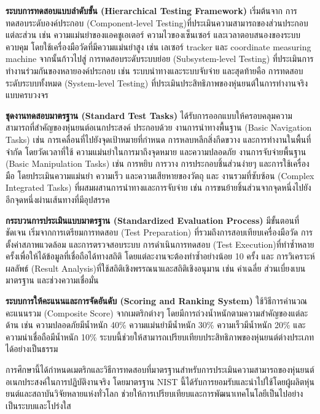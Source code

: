 \documentclass[a4paper]{article}
\begin{document}
\textbf{ระบบการทดสอบแบบลำดับขั้น (Hierarchical Testing Framework)} เริ่มต้นจาก การทดสอบระดับองค์ประกอบ (Component-level Testing)ที่ประเมินความสามารถของส่วนประกอบแต่ละส่วน เช่น ความแม่นยำของแอคชูเอเตอร์ ความไวของเซ็นเซอร์ และเวลาตอบสนองของระบบควบคุม โดยใช้เครื่องมือวัดที่มีความแม่นยำสูง เช่น เลเซอร์ tracker และ coordinate measuring machine จากนั้นก้าวไปสู่ การทดสอบระดับระบบย่อย (Subsystem-level Testing) ที่ประเมินการทำงานร่วมกันของหลายองค์ประกอบ เช่น ระบบนำทางและระบบจับจ่าย และสุดท้ายคือ การทดสอบระดับระบบทั้งหมด (System-level Testing) ที่ประเมินประสิทธิภาพของหุ่นยนต์ในการทำงานจริงแบบครบวงจร

\textbf{ชุดงานทดสอบมาตรฐาน (Standard Test Tasks)} ได้รับการออกแบบให้ครอบคลุมความสามารถที่สำคัญของหุ่นยนต์อเนกประสงค์ \parencite{xie2024pose} ประกอบด้วย งานการนำทางพื้นฐาน (Basic Navigation Tasks) เช่น การเคลื่อนที่ไปยังจุดเป้าหมายที่กำหนด การหลบหลีกสิ่งกีดขวาง และการทำงานในพื้นที่จำกัด โดยวัดเวลาที่ใช้ ความแม่นยำในการมาถึงจุดหมาย และความปลอดภัย งานการจับจ่ายพื้นฐาน (Basic Manipulation Tasks) เช่น การหยิบ การวาง การประกอบชิ้นส่วนง่ายๆ และการใช้เครื่องมือ โดยประเมินความแม่นยำ ความเร็ว และความเสียหายของวัตถุ และ งานรวมที่ซับซ้อน (Complex Integrated Tasks) ที่ผสมผสานการนำทางและการจับจ่าย เช่น การขนย้ายชิ้นส่วนจากจุดหนึ่งไปยังอีกจุดหนึ่งผ่านเส้นทางที่มีอุปสรรค

\textbf{กระบวนการประเมินแบบมาตรฐาน (Standardized Evaluation Process)} มีขั้นตอนที่ชัดเจน เริ่มจากการเตรียมการทดสอบ (Test Preparation) ที่รวมถึงการสอบเทียบเครื่องมือวัด การตั้งค่าสภาพแวดล้อม และการตรวจสอบระบบ การดำเนินการทดสอบ (Test Execution)ที่ทำซ้ำหลาย ครั้งเพื่อให้ได้ข้อมูลที่เชื่อถือได้ทางสถิติ โดยแต่ละงานจะต้องทำซ้ำอย่างน้อย 10 ครั้ง และ การวิเคราะห์ผลลัพธ์ (Result Analysis)ที่ใช้สถิติเชิงพรรณนาและสถิติเชิงอนุมาน เช่น ค่าเฉลี่ย ส่วนเบี่ยงเบนมาตรฐาน และช่วงความเชื่อมั่น

\textbf{ระบบการให้คะแนนและการจัดอันดับ (Scoring and Ranking System)} ใช้วิธีการคำนวณคะแนนรวม (Composite Score) จากเมตริกต่างๆ โดยมีการถ่วงน้ำหนักตามความสำคัญของแต่ละด้าน เช่น ความปลอดภัยมีน้ำหนัก 40\% ความแม่นยำมีน้ำหนัก 30\% ความเร็วมีน้ำหนัก 20\% และความน่าเชื่อถือมีน้ำหนัก 10\% ระบบนี้ช่วยให้สามารถเปรียบเทียบประสิทธิภาพของหุ่นยนต์ต่างประเภทได้อย่างเป็นธรรม

การศึกษานี้ได้กำหนดเมตริกและวิธีการทดสอบที่มาตรฐานสำหรับการประเมินความสามารถของหุ่นยนต์อเนกประสงค์ในการปฏิบัติงานจริง โดยมาตรฐาน NIST นี้ได้รับการยอมรับและนำไปใช้โดยผู้ผลิตหุ่นยนต์และสถาบันวิจัยหลายแห่งทั่วโลก ช่วยให้การเปรียบเทียบและการพัฒนาเทคโนโลยีเป็นไปอย่างเป็นระบบและโปร่งใส \parencite{vitolo2022mobile}
\end{document}
